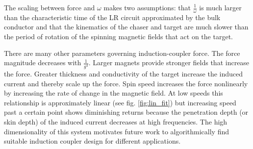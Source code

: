 The scaling between force and $\omega$ makes two assumptions: that $\frac{1}{\omega}$ is much larger than the characteristic time of the LR circuit approximated by the bulk conductor and that the kinematics of the chaser and target are much slower than the period of rotation of the spinning magnetic fields that act on the target.

There are many other parameters governing induction-coupler force. The force magnitude decreases with $\frac{1}{g^4}$. Larger magnets provide stronger fields that increase the force. Greater thickness and 
conductivity of the target increase the induced current and thereby scale up the force. Spin speed increases the force nonlinearly by increasing the rate of change in the magnetic field. At low speeds this relationship is approximately linear (see fig. \ref{fig:lin_fit}) but increasing speed past a certain point shows diminishing returns because the penetration depth (or skin depth) of the induced current decreases at high frequencies. \cite{Paudel2013} The high dimensionality of this system motivates future work to algorithmically find suitable induction coupler design for different applications.